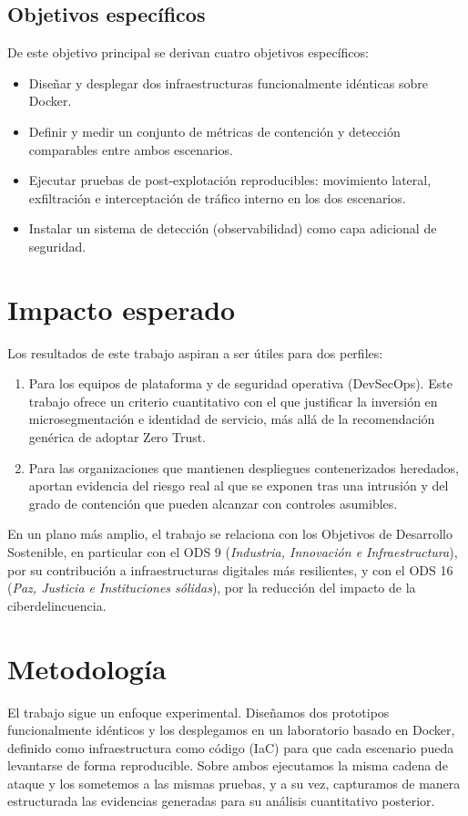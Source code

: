 \documentclass[11pt,spanish,listoffigures,listoftables]{tfgetsinf}
\begin{document}
        \subsection{Objetivos específicos}
        De este objetivo principal se derivan cuatro objetivos específicos:
        \begin{itemize}
            \item Diseñar y desplegar dos infraestructuras funcionalmente idénticas sobre Docker.
            \item Definir y medir un conjunto de métricas de contención y detección comparables entre ambos escenarios.
            \item Ejecutar pruebas de post-explotación reproducibles: movimiento lateral, exfiltración e interceptación de tráfico interno en los dos escenarios.
            \item Instalar un sistema de detección (observabilidad) como capa adicional de seguridad.
        \end{itemize}

    \section{Impacto esperado}
    Los resultados de este trabajo aspiran a ser útiles para dos perfiles:
    \begin{enumerate}
        \item Para los equipos de plataforma y de seguridad operativa (DevSecOps). Este trabajo ofrece un criterio cuantitativo con el que justificar la inversión en microsegmentación e identidad de servicio, más allá de la recomendación genérica de adoptar Zero Trust. 
        \item Para las organizaciones que mantienen despliegues contenerizados heredados, aportan evidencia del riesgo real al que se exponen tras una intrusión y del grado de contención que pueden alcanzar con controles asumibles.
    \end{enumerate}
    
    En un plano más amplio, el trabajo se relaciona con los Objetivos de Desarrollo Sostenible, en particular con el ODS 9 (\emph{Industria, Innovación e Infraestructura}), por su contribución a infraestructuras digitales más resilientes, y con el ODS 16 (\emph{Paz, Justicia e Instituciones sólidas}), por la reducción del impacto de la ciberdelincuencia. 
    
    \section{Metodología}
    El trabajo sigue un enfoque experimental. Diseñamos dos prototipos funcionalmente idénticos y los desplegamos en un laboratorio basado en Docker, definido como infraestructura como código (IaC) para que cada escenario pueda levantarse de forma reproducible. Sobre ambos ejecutamos la misma cadena de ataque y los sometemos a las mismas pruebas, y a su vez, capturamos de manera estructurada las evidencias generadas para su análisis cuantitativo posterior.
\end{document}
